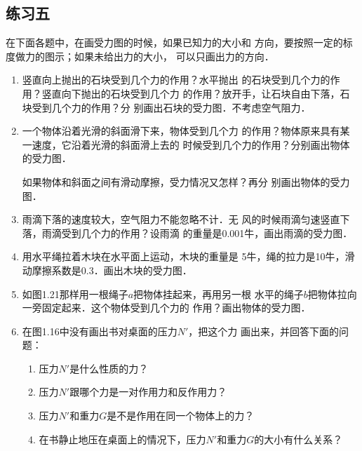 \subsection*{练习五}
    在下面各题中，在画受力图的时候，如果已知力的大小和
方向，要按照一定的标度做力的图示；如果未给出力的大小，
可以只画出力的方向．
\begin{enumerate}
\item 竖直向上抛出的石块受到几个力的作用？水平抛出
的石块受到几个力的作用？竖直向下抛出的石块受到几个力
的作用？放开手，让石块自由下落，石块受到几个力的作用？分
别画出石块的受力图．不考虑空气阻力．

\item 一个物体沿着光滑的斜面滑下来，物体受到几个力
的作用？物体原来具有某一速度，它沿着光滑的斜面滑上去的
时候受到几个力的作用？分别画出物体的受力图．

    如果物体和斜面之间有滑动摩擦，受力情况又怎样？再分
别画出物体的受力图．

\item 雨滴下落的速度较大，空气阻力不能忽略不计．无
风的时候雨滴匀速竖直下落，雨滴受到几个力的作用？设雨滴
的重量是0.001牛，画出雨滴的受力图．

\item 用水平绳拉着木块在水平面上运动，木块的重量是
5牛，绳的拉力是10牛，滑动摩擦系数是0.3．画出木块的受力图．

\item 如图1.21那样用一根绳子$a$把物体挂起来，再用另一根
水平的绳子$b$把物体拉向一旁固定起来．这个物体受到几个力的
作用？画出物体的受力图．

\begin{figure}[htp]\centering
{}
\caption{}
\end{figure}

\item  在图1.16中没有画出书对桌面的压力$N'$，把这个力
画出来，并回答下面的问题：
\begin{enumerate}
\item 压力$N'$是什么性质的力？
\item 压力$N'$跟哪个力是一对作用力和反作用力？
\item 压力$N'$和重力$G$是不是作用在同一个物体上的力？
\item 在书静止地压在桌面上的情况下，压力$N'$和重力$G$的大小有什么关系？
\end{enumerate}


\end{enumerate}


